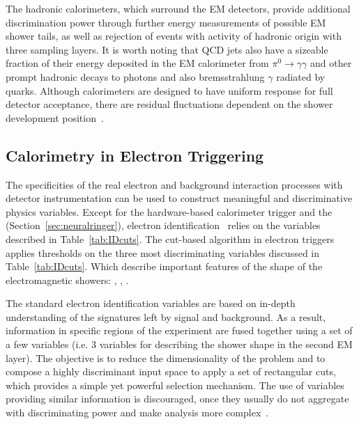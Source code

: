 The hadronic calorimeters, which surround the EM detectors,
provide additional discrimination power through further energy measurements of
possible EM shower tails, as well as rejection of events with activity of
hadronic origin with three sampling layers. It is worth noting that QCD jets also have a sizeable fraction of their energy deposited in the EM calorimeter from $\pi^{0}\rightarrow\gamma\gamma$
and other prompt hadronic decays to photons and also bremsstrahlung $\gamma$ radiated by quarks.
Although calorimeters are designed 
to have uniform response for full detector acceptance, there are residual fluctuations 
dependent on the shower development position~\cite{Wigmans2017}.



\subsection{Calorimetry in Electron Triggering}\label{ssec:std_variables}

The specificities of the real electron and background interaction processes with
detector instrumentation can be used to construct meaningful and discriminative physics variables. Except for the hardware-based calorimeter trigger
and the \rnn (Section~\ref{sec:neuralringer}), electron
identification~\cite{atlas_electron_id_offline} relies on the variables
described in Table~\ref{tab:IDcuts}. 
The cut-based algorithm in electron
triggers applies thresholds on the three most discriminating variables discussed in Table~\ref{tab:IDcuts}. Which describe important features of the shape of the electromagnetic showers: \reta{}, \eratio{}, \rhadone{}.




  
The standard electron identification variables are based on in-depth
understanding of the signatures left by signal and background.  As a result, information in specific regions of the experiment
are fused together using a set of a few variables (i.e. 3 variables for describing the shower shape in the second EM layer). The objective is to reduce the dimensionality of the problem and to compose a highly discriminant input space to apply a set of rectangular cuts, which provides a simple yet powerful selection mechanism. The use of variables providing similar information is discouraged, once they usually do not aggregate with
discriminating power and make analysis more
complex~\cite{aaboud2019electron}.


